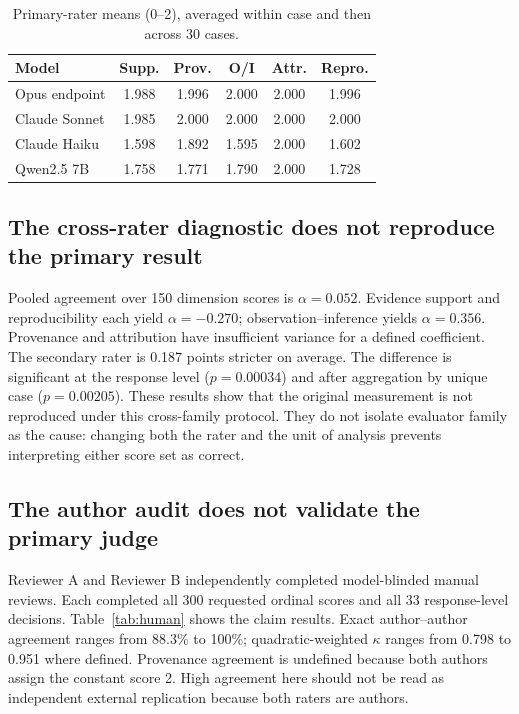 \documentclass[conference]{IEEEtran}
\begin{document}
\begin{table}[t]
\centering
\caption{Primary-rater means (0--2), averaged within case and then across 30 cases.}
\label{tab:judge}
\scriptsize
\begin{tabular}{lccccc}
\toprule
Model & Supp. & Prov. & O/I & Attr. & Repro.\\
\midrule
Opus endpoint & 1.988 & 1.996 & 2.000 & 2.000 & 1.996\\
Claude Sonnet & 1.985 & 2.000 & 2.000 & 2.000 & 2.000\\
Claude Haiku & 1.598 & 1.892 & 1.595 & 2.000 & 1.602\\
Qwen2.5 7B & 1.758 & 1.771 & 1.790 & 2.000 & 1.728\\
\bottomrule
\end{tabular}
\end{table}

\subsection{The cross-rater diagnostic does not reproduce the primary result}
Pooled agreement over 150 dimension scores is $\alpha=0.052$. Evidence support
and reproducibility each yield $\alpha=-0.270$; observation--inference yields
$\alpha=0.356$. Provenance and attribution have insufficient variance for a
defined coefficient. The secondary rater is 0.187 points stricter on average.
The difference is significant at the response level ($p=0.00034$) and after
aggregation by unique case ($p=0.00205$). These results show that the original
measurement is not reproduced under this cross-family protocol. They do not
isolate evaluator family as the cause: changing both the rater and the unit of
analysis prevents interpreting either score set as correct.

\subsection{The author audit does not validate the primary judge}
Reviewer A and Reviewer B independently completed model-blinded manual reviews.
Each completed all 300 requested ordinal scores and all 33 response-level
decisions. Table~\ref{tab:human} shows the claim results.
Exact author--author agreement ranges from 88.3\% to 100\%; quadratic-weighted
$\kappa$ ranges from 0.798 to 0.951 where defined. Provenance agreement is
undefined because both authors assign the constant score 2. High agreement here
should not be read as independent external replication because both raters are
authors.
\end{document}
